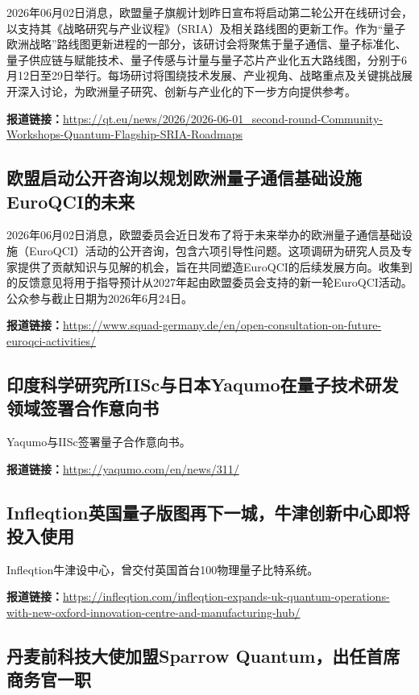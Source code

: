 \documentclass[12pt,a4paper]{ctexart}
\begin{document}
2026年06月02日消息，欧盟量子旗舰计划昨日宣布将启动第二轮公开在线研讨会，以支持其《战略研究与产业议程》（SRIA）及相关路线图的更新工作。作为“量子欧洲战略”路线图更新进程的一部分，该研讨会将聚焦于量子通信、量子标准化、量子供应链与赋能技术、量子传感与计量与量子芯片产业化五大路线图，分别于6月12日至29日举行。每场研讨将围绕技术发展、产业视角、战略重点及关键挑战展开深入讨论，为欧洲量子研究、创新与产业化的下一步方向提供参考。

\noindent\textbf{报道链接：}\url{https://qt.eu/news/2026/2026-06-01\_second-round-Community-Workshops-Quantum-Flagship-SRIA-Roadmaps}

\subsection{ 欧盟启动公开咨询以规划欧洲量子通信基础设施EuroQCI的未来 }

2026年06月02日消息，欧盟委员会近日发布了将于未来举办的欧洲量子通信基础设施（EuroQCI）活动的公开咨询，包含六项引导性问题。这项调研为研究人员及专家提供了贡献知识与见解的机会，旨在共同塑造EuroQCI的后续发展方向。收集到的反馈意见将用于指导预计从2027年起由欧盟委员会支持的新一轮EuroQCI活动。公众参与截止日期为2026年6月24日。

\noindent\textbf{报道链接：}\url{https://www.squad-germany.de/en/open-consultation-on-future-euroqci-activities/}

\subsection{ 印度科学研究所IISc与日本Yaqumo在量子技术研发领域签署合作意向书 }

Yaqumo与IISc签署量子合作意向书。

\noindent\textbf{报道链接：}\url{https://yaqumo.com/en/news/311/}

\subsection{ Infleqtion英国量子版图再下一城，牛津创新中心即将投入使用 }

Infleqtion牛津设中心，曾交付英国首台100物理量子比特系统。

\noindent\textbf{报道链接：}\url{https://infleqtion.com/infleqtion-expands-uk-quantum-operations-with-new-oxford-innovation-centre-and-manufacturing-hub/}

\subsection{ 丹麦前科技大使加盟Sparrow Quantum，出任首席商务官一职 }
\end{document}
